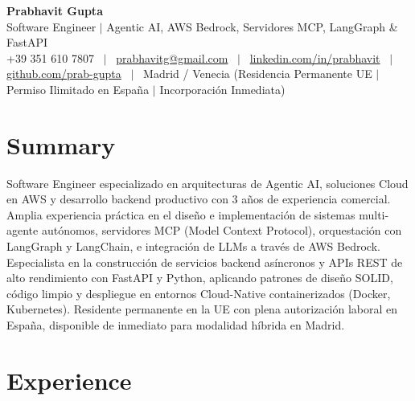 \documentclass[a4paper,10pt]{article}
\begin{document}
\begin{minipage}[c]{0.80\textwidth}
  {\Huge\bfseries Prabhavit Gupta}\\[3pt]
  {\color{accent}\large Software Engineer $\vert$ Agentic AI, AWS Bedrock, Servidores MCP, LangGraph \& FastAPI}\\[6pt]
  {\footnotesize +39 351 610 7807 ~$\vert$~
  \href{mailto:prabhavitg@gmail.com}{prabhavitg@gmail.com} ~$\vert$~
  \href{https://www.linkedin.com/in/prabhavit/}{linkedin.com/in/prabhavit} ~$\vert$~
  \href{https://github.com/prab-gupta}{github.com/prab-gupta} ~$\vert$~
  Madrid / Venecia (Residencia Permanente UE $\vert$ Permiso Ilimitado en España $\vert$ Incorporación Inmediata)}
\end{minipage}\hfill

\section{Summary}
Software Engineer especializado en arquitecturas de Agentic AI, soluciones Cloud en AWS y desarrollo backend productivo con 3 años de experiencia comercial. Amplia experiencia práctica en el diseño e implementación de sistemas multi-agente autónomos, servidores MCP (Model Context Protocol), orquestación con LangGraph y LangChain, e integración de LLMs a través de AWS Bedrock. Especialista en la construcción de servicios backend asíncronos y APIs REST de alto rendimiento con FastAPI y Python, aplicando patrones de diseño SOLID, código limpio y despliegue en entornos Cloud-Native containerizados (Docker, Kubernetes). Residente permanente en la UE con plena autorización laboral en España, disponible de inmediato para modalidad híbrida en Madrid.

\section{Experience}
\end{document}
